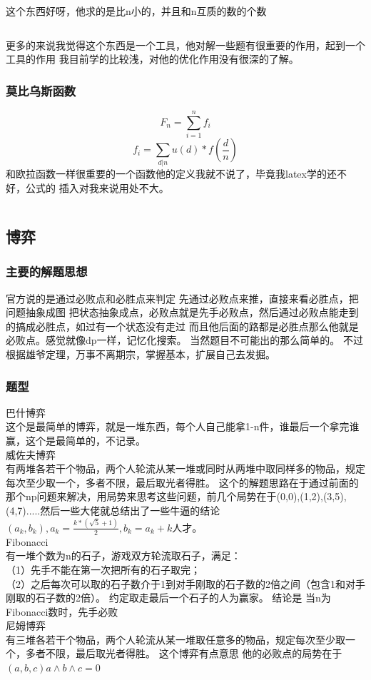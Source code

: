 \documentclass[a4paper,11pt]{article}
\begin{document}
\begin{CJK}{UTF8}{gbsn}
这个东西好呀，他求的是比n小的，并且和n互质的数的个数
\inputminted{c++}{../scoure/math/oula.cpp}
更多的来说我觉得这个东西是一个工具，他对解一些题有很重要的作用，起到一个工具的作用
我目前学的比较浅，对他的优化作用没有很深的了解。
\subsubsection{莫比乌斯函数}
$$ F_n = \sum_{i=1}^n f_i $$
$$ f_i = \sum_{d|n} u(d)*f(\frac{d}{n}) $$
和欧拉函数一样很重要的一个函数他的定义我就不说了，毕竟我latex学的还不好，公式的
插入对我来说用处不大。
\inputminted{c++}{../scoure/math/mobius.cpp}
\newpage
\subsection{博弈}
\subsubsection{主要的解题思想}
官方说的是通过必败点和必胜点来判定
先通过必败点来推，直接来看必胜点，把问题抽象成图 把状态抽象成点，必败点就是先手必败点，然后通过必败点能走到的搞成必胜点，如过有一个状态没有走过 而且他后面的路都是必胜点那么他就是必败点。感觉就像dp一样，记忆化搜索。
当然题目不可能出的那么简单的。
不过根据雄爷定理，万事不离期宗，掌握基本，扩展自己去发掘。
\subsubsection{题型}
巴什博弈\\
这个是最简单的博弈，就是一堆东西，每个人自己能拿1-n件，谁最后一个拿完谁赢，这个是最简单的，不记录。
\\威佐夫博弈\\
有两堆各若干个物品，两个人轮流从某一堆或同时从两堆中取同样多的物品，规定每次至少取一个，多者不限，最后取光者得胜。
这个的解题思路在于通过前面的那个np问题来解决，用局势来思考这些问题，前几个局势在于(0,0),(1,2),(3,5),(4,7).....然后一些大佬就总结出了一些牛逼的结论$( a_k,b_k),a_k=\frac{k*(\sqrt{5}+1)}{2} , b_k=a_k+k$人才。
\\Fibonacci\\
有一堆个数为n的石子，游戏双方轮流取石子，满足：
\\（1）先手不能在第一次把所有的石子取完；
\\（2）之后每次可以取的石子数介于1到对手刚取的石子数的2倍之间（包含1和对手刚取的石子数的2倍）。 约定取走最后一个石子的人为赢家。
结论是 当n为Fibonacci数时，先手必败
\\尼姆博弈\\
有三堆各若干个物品，两个人轮流从某一堆取任意多的物品，规定每次至少取一个，多者不限，最后取光者得胜。
这个博弈有点意思 他的必败点的局势在于$(a,b,c) a \land {b \land c} = 0$

\end{CJK}
\end{document}
